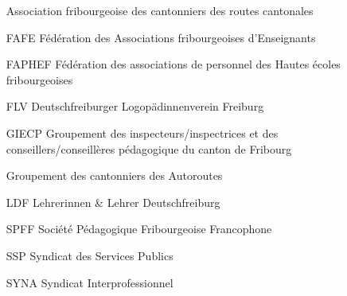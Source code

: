 \begin{enumerate}
\item[] Association fribourgeoise des cantonniers des routes cantonales

\item[FAFE]
	Fédération des Associations fribourgeoises d'Enseignants

\item[FAPHEF]
	Fédération des associations de personnel des Hautes écoles
	fribourgeoises

\item[FLV]
	Deutschfreiburger Logopädinnenverein Freiburg

\item[GIECP]
	Groupement des inspecteurs/inspectrices et des
	conseillers/conseillères pédagogique du canton de Fribourg

\item[] Groupement des cantonniers des Autoroutes

\item[LDF]
	Lehrerinnen \& Lehrer Deutschfreiburg

\item[SPFF]
	Société Pédagogique Fribourgeoise Francophone

\item[SSP]
	Syndicat des Services Publics

\item[SYNA]
	Syndicat Interprofessionnel

\end{enumerate}


